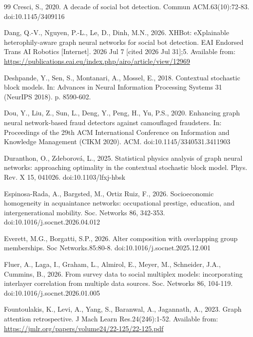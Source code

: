 \documentclass[preprint,12pt,authoryear]{elsarticle}
\theoremstyle{definition}
\begin{document}
\begin{thebibliography}{99}
Cresci, S., 2020. A decade of social bot detection. Commun ACM.63(10):72-83. doi:10.1145/3409116

Dang, Q.-V., Nguyen, P.-L., Le, D., Dinh, M.N., 2026. XHBot: eXplainable heterophily-aware graph neural networks for social bot detection. EAI Endorsed Trans AI Robotics [Internet]. 2026 Jul 7 [cited 2026 Jul 31];5. Available from: \url{https://publications.eai.eu/index.php/airo/article/view/12969}

Deshpande, Y., Sen, S., Montanari, A., Mossel, E., 2018. Contextual stochastic block models. In: Advances in Neural Information Processing Systems 31 (NeurIPS 2018). p. 8590-602.

Dou, Y., Liu, Z., Sun, L., Deng, Y., Peng, H., Yu, P.S., 2020. Enhancing graph neural network-based fraud detectors against camouflaged fraudsters. In: Proceedings of the 29th ACM International Conference on Information and Knowledge Management (CIKM 2020). ACM. doi:10.1145/3340531.3411903

Duranthon, O., Zdeborov\'a, L., 2025. Statistical physics analysis of graph neural networks: approaching optimality in the contextual stochastic block model. Phys. Rev. X 15, 041026. doi:10.1103/lfxj-hbsk

Espinosa-Rada, A., Bargsted, M., Ortiz Ruiz, F., 2026. Socioeconomic homogeneity in acquaintance networks: occupational prestige, education, and intergenerational mobility. Soc. Networks 86, 342-353. doi:10.1016/j.socnet.2026.04.012

Everett, M.G., Borgatti, S.P., 2026. Alter composition with overlapping group memberships. Soc Networks.85:80-8. doi:10.1016/j.socnet.2025.12.001

Fluer, A., Laga, I., Graham, L., Almirol, E., Meyer, M., Schneider, J.A., Cummins, B., 2026. From survey data to social multiplex models: incorporating interlayer correlation from multiple data sources. Soc. Networks 86, 104-119. doi:10.1016/j.socnet.2026.01.005

Fountoulakis, K., Levi, A., Yang, S., Baranwal, A., Jagannath, A., 2023. Graph attention retrospective. J Mach Learn Res.24(246):1-52. Available from: \url{https://jmlr.org/papers/volume24/22-125/22-125.pdf}


\end{thebibliography}
\end{document}
